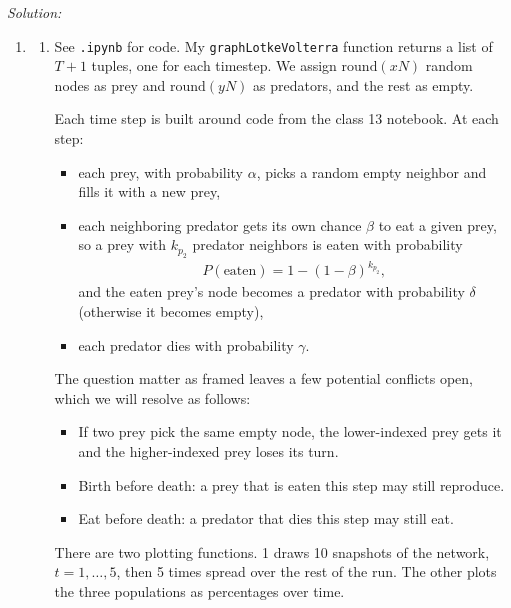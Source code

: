 \documentclass{article}
\newenvironment{solution}
    {\noindent \textit{Solution:}\vspace{1em}\\}
    {\newpage}
\newcommand{\pl}{\left(}
\newcommand{\pr}{\right)}
\begin{document}
\begin{solution}
\begin{enumerate}
    \item [] \begin{enumerate}
        \item  See \texttt{.ipynb} for code. My \texttt{graphLotkeVolterra} function returns a list of $T+1$ tuples, one
        for each timestep. We assign $\mathrm{round}\pl xN \pr$ random nodes as prey and $\mathrm{round}\pl yN \pr$
        as predators, and the rest as empty.

        Each time step is built around code from the class 13 notebook.  
        At each step:
        \begin{itemize}
            \item each prey, with probability $\alpha$, picks a random empty neighbor and fills it with a new prey,
            \item each neighboring predator gets its own chance $\beta$ to eat a given prey, so a prey with $k_{p_2}$
            predator neighbors is eaten with probability
            \begin{align*}
                P\pl \text{eaten} \pr = 1 - \pl 1 - \beta \pr^{k_{p_2}},
            \end{align*}
            and the eaten prey's node becomes a predator with probability $\delta$ (otherwise it becomes empty),
            \item each predator dies with probability $\gamma$.
        \end{itemize}
        The question matter as framed leaves a few potential conflicts open, which we will resolve as follows:
        \begin{itemize}
            \item If two prey pick the same empty node, the lower-indexed prey gets it and the higher-indexed prey
            loses its turn.
            \item Birth before death: a prey that is eaten this step may still reproduce.
            \item Eat before death: a predator that dies this step may still eat.
        \end{itemize}
        There are two plotting functions. 1 draws 10 snapshots of the network, $t = 1, \dots, 5$, then 5
        times spread over the rest of the run. The other plots the three populations as percentages
        over time. 


\end{enumerate}
\end{enumerate}
\end{solution}
\end{document}
